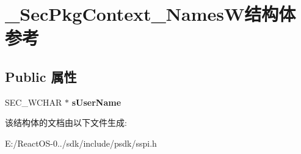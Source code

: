 \hypertarget{struct___sec_pkg_context___names_w}{}\section{\+\_\+\+Sec\+Pkg\+Context\+\_\+\+Names\+W结构体 参考}
\label{struct___sec_pkg_context___names_w}
\subsection*{Public 属性}
\begin{DoxyCompactItemize}
\item 
\mbox{\label{struct___sec_pkg_context___names_w_a83f21c07c5a378e253bdb79084b5fb71}} 
S\+E\+C\+\_\+\+W\+C\+H\+AR $\ast$ {\bfseries s\+User\+Name}
\end{DoxyCompactItemize}


该结构体的文档由以下文件生成\+:\begin{DoxyCompactItemize}
\item 
E\+:/\+React\+O\+S-\/0../sdk/include/psdk/sspi.\+h\end{DoxyCompactItemize}
